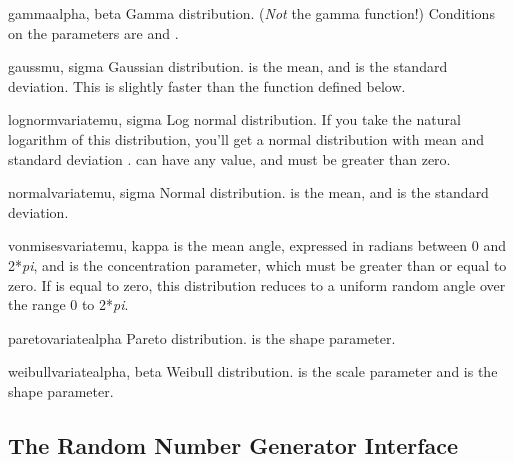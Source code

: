 \begin{funcdesc}{gamma}{alpha, beta}
Gamma distribution.  (\emph{Not} the gamma function!)  Conditions on
the parameters are  and .
\end{funcdesc}

\begin{funcdesc}{gauss}{mu, sigma}
Gaussian distribution.   is the mean, and  is the
standard deviation.  This is slightly faster than the
 function defined below.
\end{funcdesc}

\begin{funcdesc}{lognormvariate}{mu, sigma}
Log normal distribution.  If you take the natural logarithm of this
distribution, you'll get a normal distribution with mean  and
standard deviation .   can have any value, and
 must be greater than zero.  
\end{funcdesc}

\begin{funcdesc}{normalvariate}{mu, sigma}
Normal distribution.   is the mean, and  is the
standard deviation.
\end{funcdesc}

\begin{funcdesc}{vonmisesvariate}{mu, kappa}
 is the mean angle, expressed in radians between 0 and 2*\emph{pi},
and  is the concentration parameter, which must be greater
than or equal to zero.  If  is equal to zero, this
distribution reduces to a uniform random angle over the range 0 to
2*\emph{pi}.
\end{funcdesc}

\begin{funcdesc}{paretovariate}{alpha}
Pareto distribution.   is the shape parameter.
\end{funcdesc}

\begin{funcdesc}{weibullvariate}{alpha, beta}
Weibull distribution.   is the scale parameter and
 is the shape parameter.
\end{funcdesc}

\begin{seealso}
\end{seealso}


\subsection{The Random Number Generator Interface
            \label{rng-objects}}


